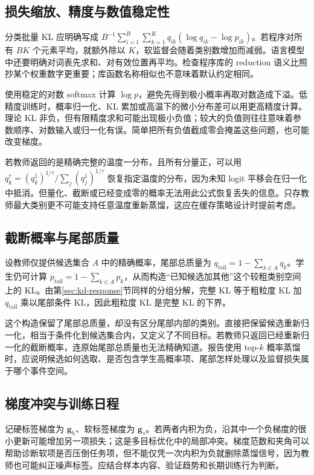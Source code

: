 \documentclass[UTF8,12pt,a4paper,fontset=fandol]{ctexart}
\begin{document}
\subsection{损失缩放、精度与数值稳定性}
分类批量 KL 应明确写成 $B^{-1}\sum_{i=1}^B\sum_{k=1}^Kq_{ik}(\log q_{ik}-\log p_{ik})$。若程序对所有 $BK$ 个元素平均，就额外除以 $K$，软监督会随着类别数增加而减弱。语言模型中还要明确对词表先求和、对有效位置再平均。检查程序库的 reduction 语义比照抄某个权重数字更重要；库函数名称相似也不意味着默认约定相同。

使用稳定的对数 softmax 计算 $\log p$，避免先得到极小概率再取对数造成下溢。低精度训练时，概率归一化、KL 累加或高温下的微小分布差可以用更高精度计算。理论 KL 非负，但有限精度求和可能出现极小负值；较大的负值则往往意味着参数顺序、对数输入或归一化有误。简单把所有负值截成零会掩盖这些问题，也可能改变梯度。

若教师返回的是精确完整的温度一分布，且所有分量正，可以用 $q_k^\tau=(q_k^1)^{1/\tau}/\sum_j(q_j^1)^{1/\tau}$ 恢复指定温度的分布，因为未知 logit 平移会在归一化中抵消。但量化、截断或已经变成零的概率无法用此公式恢复丢失的信息。只存教师最大类别更不可能支持任意温度重新蒸馏，这应在缓存策略设计时提前考虑。

\subsection{截断概率与尾部质量}
设教师仅提供候选集合 $A$ 中的精确概率，尾部总质量为 $q_{\mathrm{tail}}=1-\sum_{k\in A}q_k$。学生仍可计算 $p_{\mathrm{tail}}=1-\sum_{k\in A}p_k$，从而构造“已知候选加其他”这个较粗类别空间上的 KL。由第\ref{sec:kd-response}节同样的分组分解，完整 KL 等于粗粒度 KL 加 $q_{\mathrm{tail}}$ 乘以尾部条件 KL，因此粗粒度 KL 是完整 KL 的下界。

这个构造保留了尾部总质量，却没有区分尾部内部的类别。直接把保留候选重新归一化，相当于条件化到候选集合内，又定义了不同目标。若教师只返回已经重新归一化的截断概率，连原始尾部总质量也无法精确知道。报告使用 top-$k$ 概率蒸馏时，应说明候选如何选取、是否包含学生高概率项、尾部怎样处理以及监督损失属于哪个事件空间。

\subsection{梯度冲突与训练日程}
记硬标签梯度为 $\mathbf g_h$、软标签梯度为 $\mathbf g_s$。若两者内积为负，沿其中一个负梯度的很小更新可能增加另一项损失；这是多目标优化中的局部冲突。梯度范数和夹角可以帮助诊断软项是否压倒任务项，但不能仅凭一次内积为负就删除蒸馏信号，因为教师也可能纠正噪声标签。应结合样本内容、验证趋势和长期训练行为判断。
\end{document}
